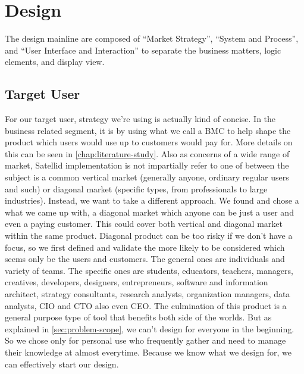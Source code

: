 \section{Design}
\label{sec:design}

The design mainline are composed of ``Market Strategy'', ``System and Process'', and ``User Interface and Interaction'' to separate the business matters, logic elements, and display view.

\subsection{Target User}

For our target user, strategy we're using is actually kind of concise. In the business related segment, it is by using what we call a \ac{BMC} to help shape the product which users would use up to customers would pay for.
More details on this can be seen in \autoref{chap:literature-study}.
Also as concerns of a wide range of market, Satellid implementation is not impartially refer to one of between the subject is a common vertical market (generally anyone, ordinary regular users and such) or diagonal market (specific types, from professionals to large industries).
Instead, we want to take a different approach.
We found and chose a what we came up with, a diagonal market which anyone can be just a user and even a paying customer.
This could cover both vertical and diagonal market within the same product.
Diagonal product can be too risky if we don't have a focus, so we first defined and validate the more likely to be considered which seems only be the users and customers.
The general ones are individuals and variety of teams.
The specific ones are students, educators, teachers, managers, creatives, developers, designers, entrepreneurs, software and information architect, strategy consultants, research analysts, organization managers, data analysts, \ac{CIO} and \ac{CTO} also even \ac{CEO}.
The culmination of this product is a general purpose type of tool that benefits both side of the worlds.
But as explained in \autoref{sec:problem-scope}, we can't design for everyone in the beginning.
So we chose only for personal use who frequently gather and need to manage their knowledge at almost everytime.
Because we know what we design for, we can effectively start our design.

